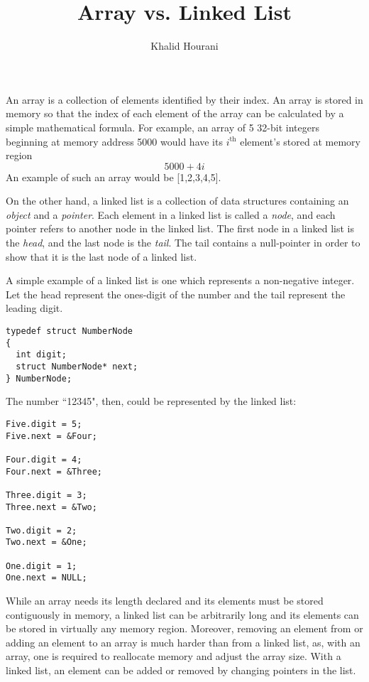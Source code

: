 \documentclass[a4paper]{article}
\title{Array vs. Linked List}
\author{Khalid Hourani}
\begin{document}
\maketitle
An array is a collection of elements identified by their index. An array is stored in memory so that the index of each element of the array can be calculated by a simple mathematical formula. For example, an array of 5 32-bit integers beginning at memory address 5000 would have its $i^{\text{th}}$ element's stored at memory region \[5000 + 4i\] An example of such an array would be [1,2,3,4,5]. 

On the other hand, a linked list is a collection of data structures containing an \textit{object} and a \textit{pointer}. Each element in a linked list is called a \textit{node}, and each pointer refers to another node in the linked list. The first node in a linked list is the \textit{head}, and the last node is the \textit{tail}. The tail contains a null-pointer in order to show that it is the last node of a linked list. 

A simple example of a linked list is one which represents a non-negative integer. Let the head represent the ones-digit of the number and the tail represent the leading digit.

\begin{verbatim}
typedef struct NumberNode
{
  int digit;
  struct NumberNode* next;
} NumberNode;
\end{verbatim}

The number ``12345", then, could be represented by the linked list:

\begin{verbatim}
Five.digit = 5;
Five.next = &Four;

Four.digit = 4;
Four.next = &Three;

Three.digit = 3;
Three.next = &Two;

Two.digit = 2;
Two.next = &One;

One.digit = 1;
One.next = NULL;
\end{verbatim}

While an array needs its length declared and its elements must be stored contiguously in memory, a linked list can be arbitrarily long and its elements can be stored in virtually any memory region. Moreover, removing an element from or adding an element to an array is much harder than from a linked list, as, with an array, one is required to reallocate memory and adjust the array size. With a linked list, an element can be added or removed by changing pointers in the list. 
\end{document}
